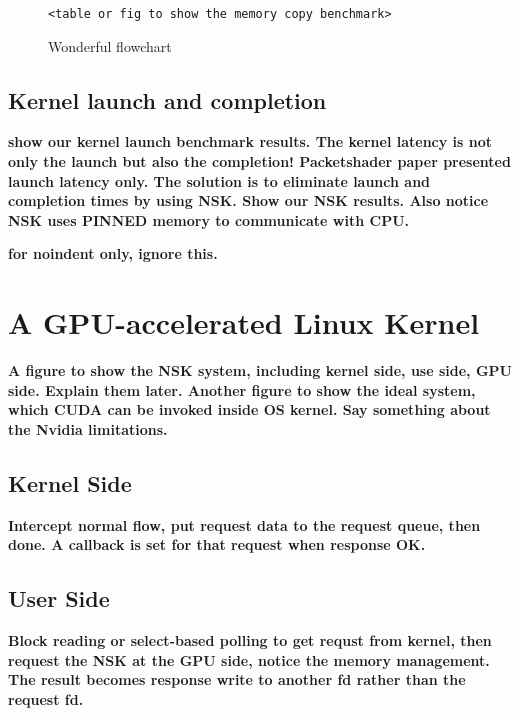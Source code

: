 \documentclass[letterpaper,twocolumn,10pt]{article}
\begin{document}
\begin{figure}[t]
  \begin{center}
     \texttt{<table or fig to show the memory copy benchmark>}
    \caption{Wonderful flowchart}
    \label{fig:flowchart}
  \end{center}
\end{figure}

\subsection{Kernel launch and completion}

{\color{red} \textbf{ show our kernel launch benchmark results. The kernel latency is not only the launch but also the completion! Packetshader paper presented launch latency only. The solution is to eliminate launch and completion times by using NSK. Show our NSK results. Also notice NSK uses PINNED memory to communicate with CPU. } }

\noindent
{\color{red} \textbf{ for noindent only, ignore this. } }


\section{A GPU-accelerated Linux Kernel}

{\color{red} \bf A figure to show the NSK system, including kernel side, use side, GPU side. Explain them later. Another figure to show the ideal system, which CUDA can be invoked inside OS kernel. Say something about the Nvidia limitations.}

\subsection{Kernel Side}

{\color{red} \bf Intercept normal flow, put request data to the request queue, then done. A callback is set for that request when response OK.}

\subsection{User Side}

{\color{red} \bf Block reading or select-based polling to get requst from kernel, then request the NSK at the GPU side, notice the memory management. The result becomes response write to another fd rather than the request fd.}
\end{document}
